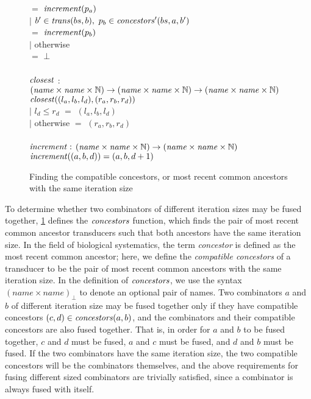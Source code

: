 \begin{figure}
\begin{tabbing}
        \>     \>                      \> $=$ \> $\mathit{increment}(p_a)$ \\
        \> $|$ \> $b' \in \mathit{trans}(bs,b),~ p_b \in \mathit{concestors}'(bs,a,b')$ \\
        \>     \>                      \> $=$ \> $\mathit{increment}(p_b)$ \\
        \> $|$ \> otherwise            \\
        \>     \>                      \> $=$    \> $\bot$
\\
\\
$\mathit{closest}$ \> $:$ \> $(\mathit{name} \times \mathit{name} \times \mathbb{N}) \to (\mathit{name} \times \mathit{name} \times \mathbb{N}) \to (\mathit{name} \times \mathit{name} \times \mathbb{N})$ \\
$\mathit{closest}((l_a,l_b,l_d), (r_a,r_b,r_d))$ \\
        \> $|$ \> $l_d \le r_d$ \> \> \> $=$ \> $(l_a,l_b,l_d)$ \\
        \> $|$ \> otherwise     \> \> \> $=$ \> $(r_a,r_b,r_d)$ \\
\\
$\mathit{increment} :$ \> \> $(\mathit{name} \times \mathit{name} \times \mathbb{N}) \to (\mathit{name} \times \mathit{name} \times \mathbb{N})$ \\
$\mathit{increment}((a,b,d)) = (a,b,d+1)$ \\
\end{tabbing}

\caption{Finding the compatible concestors, or most recent common ancestors with the same iteration size}
\label{fig:clustering:concestors}
\end{figure}

To determine whether two combinators of different iteration sizes may be fused together, \cref{fig:clustering:concestors} defines the $\mathit{concestors}$ function, which finds the pair of most recent common ancestor transducers such that both ancestors have the same iteration size.
In the field of biological systematics, the term \emph{concestor} is defined as the most recent common ancestor; here, we define the \emph{compatible concestors} of a transducer to be the pair of most recent common ancestors with the same iteration size.
In the definition of $\mathit{concestors}$, we use the syntax $(name \times name)_\bot$ to denote an optional pair of names.
Two combinators $a$ and $b$ of different iteration size may be fused together only if they have compatible concestors $(c, d) \in \mathit{concestors}(a,b)$, and the combinators and their compatible concestors are also fused together.
That is, in order for $a$ and $b$ to be fused together, $c$ and $d$ must be fused, $a$ and $c$ must be fused, and $d$ and $b$ must be fused.
If the two combinators have the same iteration size, the two compatible concestors will be the combinators themselves, and the above requirements for fusing different sized combinators are trivially satisfied, since a combinator is always fused with itself.

